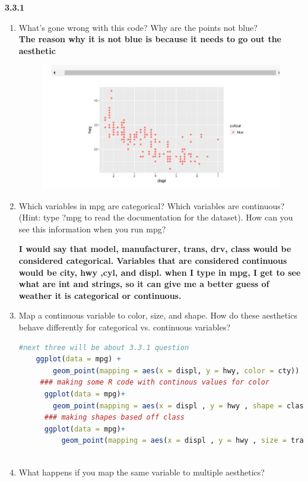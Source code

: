 \documentclass[11pt]{article}
\begin{document}
\noindent\textbf{3.3.1}
\begin{enumerate}
    \item What’s gone wrong with this code? Why are the points not blue?\\ \textbf{The reason why it is not blue is because it needs to go out the aesthetic
    }
    
\begin{figure}[h]
\includegraphics[scale = .7]{sample.png}
\centering
\end{figure}
    \item Which variables in mpg are categorical? Which variables are continuous? (Hint: type ?mpg to read the documentation for the dataset). How can you see this information when you run mpg?
    
  \textbf{I would say that model, manufacturer, trans, drv, class would be considered categorical. Variables that are considered continuous would be city, hwy ,cyl, and displ. when I type in mpg, I get to see what are int and strings, so it can give me a better guess of weather it is categorical or continuous. }
  
  \item Map a continuous variable to color, size, and shape. How do these aesthetics behave differently for categorical vs. continuous variables?
  \begin{lstlisting}[language=R]
    #next three will be about 3.3.1 question
    ggplot(data = mpg) +
        geom_point(mapping = aes(x = displ, y = hwy, color = cty)) 
     ### making some R code with continous values for color 
      ggplot(data = mpg)+
        geom_point(mapping = aes(x = displ , y = hwy , shape = class))
      ### making shapes based off class
      ggplot(data = mpg)+
          geom_point(mapping = aes(x = displ , y = hwy , size = trans))
      
       \end{lstlisting}
       \newpage
    \item What happens if you map the same variable to multiple aesthetics? 
    

\end{enumerate}
\end{document}
